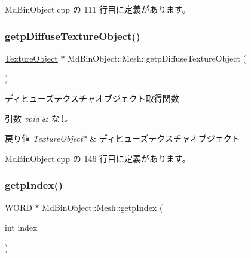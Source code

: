  Md\+Bin\+Object.\+cpp の 111 行目に定義があります。

\mbox{\label{class_md_bin_object_1_1_mesh_ae3aea9879a86c16661e7030b3cdb0b58}} 
\subsubsection{\texorpdfstring{getp\+Diffuse\+Texture\+Object()}{getpDiffuseTextureObject()}}
{\footnotesize\ttfamily \mbox{\hyperlink{class_texture_object}{Texture\+Object}} $\ast$ Md\+Bin\+Object\+::\+Mesh\+::getp\+Diffuse\+Texture\+Object (\begin{DoxyParamCaption}{ }\end{DoxyParamCaption})}



ディヒューズテクスチャオブジェクト取得関数 


\begin{DoxyParams}{引数}
{\em void} & なし \\
\hline
\end{DoxyParams}

\begin{DoxyRetVals}{戻り値}
{\em Texture\+Object$\ast$} & ディヒューズテクスチャオブジェクト \\
\hline
\end{DoxyRetVals}


 Md\+Bin\+Object.\+cpp の 146 行目に定義があります。

\mbox{\label{class_md_bin_object_1_1_mesh_a92e04810b2fafa386142f02128091fdb}} 
\subsubsection{\texorpdfstring{getp\+Index()}{getpIndex()}}
{\footnotesize\ttfamily W\+O\+RD $\ast$ Md\+Bin\+Object\+::\+Mesh\+::getp\+Index (\begin{DoxyParamCaption}\item[{int}]{index }\end{DoxyParamCaption})}



